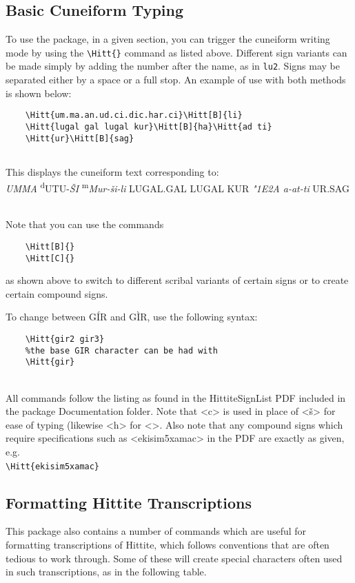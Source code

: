 \documentclass[12pt,A4]{article}
\begin{document}
\subsection{Basic Cuneiform Typing}
To use the package, in a given section, you can trigger the cuneiform writing mode by using the \verb|\Hitt{}| command as listed above. Different sign variants can be made simply by adding the number after the name, as in \verb|lu2|. Signs may be separated either by a space or a full stop. An example of use with both methods is shown below:
\begin{verbatim}
    \Hitt{um.ma.an.ud.ci.dic.har.ci}\Hitt[B]{li}
    \Hitt{lugal gal lugal kur}\Hitt[B]{ha}\Hitt{ad ti}
    \Hitt{ur}\Hitt[B]{sag}
    
\end{verbatim}
This displays the cuneiform text corresponding to: 
\\

\textit{UMMA} \textsuperscript{d}UTU-\textit{\v{S}I} \textsuperscript{m}\textit{Mur-\v{s}i-li} LUGAL.GAL LUGAL KUR \textit{\char"1E2A a-at-ti} UR.SAG

    \\

Note that you can use the commands
\begin{verbatim}
    \Hitt[B]{}
    \Hitt[C]{}
\end{verbatim}
as shown above to switch to different scribal variants of certain signs or to create certain compound signs. 

\newpage
To change between G\'IR and G\`IR, use the following syntax:
\begin{verbatim}
    \Hitt{gir2 gir3}
    %the base GIR character can be had with
    \Hitt{gir}
\end{verbatim}

\\

All commands follow the listing as found in the HittiteSignList PDF included in the package Documentation folder. Note that <c> is used in place of <\v{s}> for ease of typing (likewise <h> for <\funh>. Also note that any compound signs which require specifications such as <ekisim5xamac> in the PDF are exactly as given, e.g.\\

\verb|\Hitt{ekisim5xamac}|\ \ 

\subsection{Formatting Hittite Transcriptions}
This package also contains a number of commands which are useful for formatting transcriptions of Hittite, which follows conventions that are often tedious to work through. Some of these will create special characters often used in such transcriptions, as in the following table.
\end{document}
